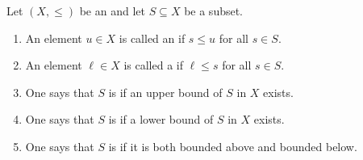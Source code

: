 \begin{definition} \label{definition:upper_and_lower_bounds_of_subsets_of_an_ordered_set}
Let $(X,\leq)$ be an  and let $S \subseteq X$ be a subset.
\begin{enumerate}
  \item An element $u \in X$ is called an  if $s \leq u$ for all $s \in S$.
  \item An element $\ell \in X$ is called a  if $\ell \leq s$ for all $s \in S$.

  \item One says that $S$ is  if an upper bound of $S$ in $X$ exists.
  \item One says that $S$ is  if a lower bound of $S$ in $X$ exists.

  \item One says that $S$ is  if it is both bounded above and bounded below.
\end{enumerate}
\end{definition}